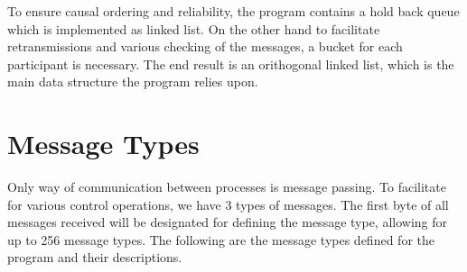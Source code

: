 \documentclass[11pt]{report}
\begin{document}
	To ensure causal ordering and reliability, the program contains a hold back queue which is implemented as linked list. On the other hand to facilitate retransmissions and various checking of the messages, a bucket for each participant is necessary. The end result is an orithogonal linked list, which is the main data structure the program relies upon.


	\section{Message Types}
Only way of communication between processes is message passing. To facilitate for various control operations, we have 3 types of messages.
		The first byte of all messages received will be designated for defining the message type, allowing for up to 256 message types.  The following are the message types defined for the program and their descriptions. 
\end{document}
